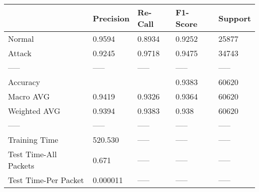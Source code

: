 \begin{tabular}{lllll}
\toprule
{} & Precision & Re-Call & F1-Score & Support \\
\midrule
Normal                &    0.9594 &  0.8934 &   0.9252 &   25877 \\
Attack                &    0.9245 &  0.9718 &   0.9475 &   34743 \\
-----                 &     ----- &   ----- &    ----- &   ----- \\
Accuracy              &           &         &   0.9383 &   60620 \\
Macro AVG             &    0.9419 &  0.9326 &   0.9364 &   60620 \\
Weighted AVG          &    0.9394 &  0.9383 &    0.938 &   60620 \\
-----                 &     ----- &   ----- &    ----- &   ----- \\
Training Time         &   520.530 &   ----- &    ----- &   ----- \\
Test Time-All Packets &     0.671 &   ----- &    ----- &   ----- \\
Test Time-Per Packet  &  0.000011 &   ----- &    ----- &   ----- \\
\bottomrule
\end{tabular}
